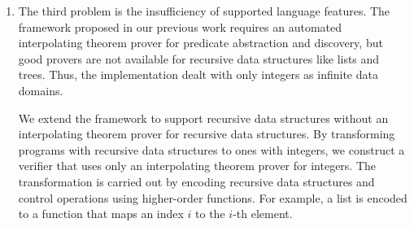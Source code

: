 \begin{enumerate}
%


%
%

\item The third problem is the insufficiency of supported language
      features.  The framework proposed in our previous work requires an
      automated interpolating theorem prover for predicate abstraction and
      discovery, but good provers are not available for recursive data
      structures like lists and trees. Thus, the implementation dealt with
      only integers as infinite data domains.

      We extend the framework to support recursive data structures
      without an interpolating theorem prover for recursive data
      structures.  By transforming programs with recursive data
      structures to ones with integers, we construct a verifier that
      uses only an interpolating theorem prover for integers.  The
      transformation is carried out by encoding recursive data
      structures and control operations using higher-order functions.
      For example, a list is encoded to a function that maps an index
      $i$ to the $i$-th element.
\end{enumerate}

